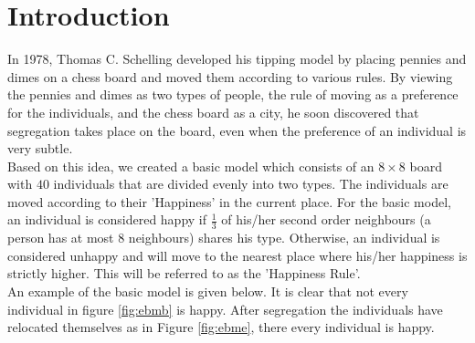 \section{Introduction}
In 1978, Thomas C. Schelling developed his tipping model by placing pennies and dimes on a chess board and moved them according to various rules. 
By viewing the pennies and dimes as two types of people, the rule of moving as a preference for the individuals, and the chess board as a city, he soon discovered that segregation takes place on the board, even when the preference of an individual is very subtle.\\

Based on this idea, we created a basic model which consists of an $8\times8$ board with $40$ individuals that are divided evenly into two types. 
The individuals are moved according to their 'Happiness' in the current place. 
For the basic model, an individual is considered happy if $\frac{1}{3}$ of his/her second order neighbours (a person has at most $8$ neighbours) shares his type. 
Otherwise, an individual is considered unhappy and will move to the nearest place where  his/her happiness is strictly higher. This will be referred to as the 'Happiness Rule'.\\

An example of the basic model is given below. It is clear that not every individual in figure \ref{fig:ebmb} is happy. After segregation the individuals have relocated themselves as in Figure \ref{fig:ebme}, there every individual is happy.

